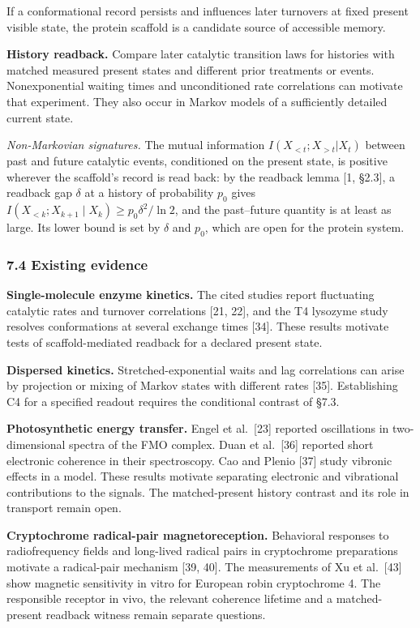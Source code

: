 \documentclass[
]{article}
\begin{document}
If a conformational record persists and influences later turnovers at
fixed present visible state, the protein scaffold is a candidate source
of accessible memory.

\textbf{History readback.} Compare later catalytic transition laws for
histories with matched measured present states and different prior
treatments or events. Nonexponential waiting times and unconditioned
rate correlations can motivate that experiment. They also occur in
Markov models of a sufficiently detailed current state.

\emph{Non-Markovian signatures.} The mutual information
\(I(X_{<t}; X_{>t} | X_t)\) between past and future catalytic events,
conditioned on the present state, is positive wherever the scaffold's
record is read back: by the readback lemma {[}1, §2.3{]}, a readback gap
\(\delta\) at a history of probability \(p_0\) gives
\(I(X_{<k}; X_{k+1} \mid X_k) \geq p_0\delta^2/\ln 2\), and the
past--future quantity is at least as large. Its lower bound is set by
\(\delta\) and \(p_0\), which are open for the protein system.

\hypertarget{existing-evidence}{%
\subsubsection{7.4 Existing evidence}\label{existing-evidence}}

\textbf{Single-molecule enzyme kinetics.} The cited studies report
fluctuating catalytic rates and turnover correlations {[}21, 22{]}, and
the T4 lysozyme study resolves conformations at several exchange times
{[}34{]}. These results motivate tests of scaffold-mediated readback for
a declared present state.

\textbf{Dispersed kinetics.} Stretched-exponential waits and lag
correlations can arise by projection or mixing of Markov states with
different rates {[}35{]}. Establishing C4 for a specified readout
requires the conditional contrast of §7.3.

\textbf{Photosynthetic energy transfer.} Engel et al.~{[}23{]} reported
oscillations in two-dimensional spectra of the FMO complex. Duan et
al.~{[}36{]} reported short electronic coherence in their spectroscopy.
Cao and Plenio {[}37{]} study vibronic effects in a model. These results
motivate separating electronic and vibrational contributions to the
signals. The matched-present history contrast and its role in transport
remain open.

\textbf{Cryptochrome radical-pair magnetoreception.} Behavioral
responses to radiofrequency fields and long-lived radical pairs in
cryptochrome preparations motivate a radical-pair mechanism {[}39,
40{]}. The measurements of Xu et al.~{[}43{]} show magnetic sensitivity
in vitro for European robin cryptochrome 4. The responsible receptor in
vivo, the relevant coherence lifetime and a matched-present readback
witness remain separate questions.
\end{document}
